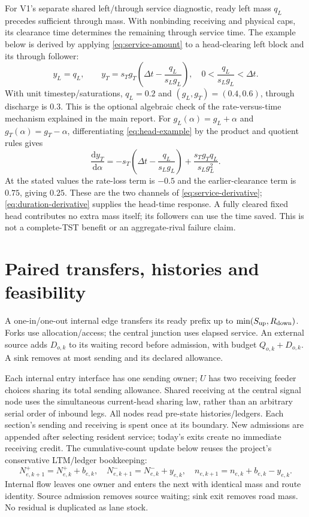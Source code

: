 \documentclass[10pt,a4paper]{article}
\newcommand{\rev}[1]{{\color{revisionred}#1}}
\begin{document}
For V1's separate shared left/through service diagnostic, ready left
mass $q_L$ precedes sufficient through mass. With nonbinding receiving
and physical caps, its clearance time determines the remaining through
service time.
\rev{The example below is derived by applying \eqref{eq:service-amount} to a head-clearing left block and its through follower:}
\begin{equation}
 y_L=q_L,\qquad
 y_T=s_Tg_T\left(\Delta t-\frac{q_L}{s_Lg_L}\right),
 \quad 0<\frac{q_L}{s_Lg_L}<\Delta t.
 \label{eq:head-example}
\end{equation}
With unit timestep/saturations, $q_L=0.2$ and $(g_L,g_T)=(0.4,0.6)$,
through discharge is $0.3$. This is the optional algebraic check of the
rate-versus-time mechanism explained in the main report. For
$g_L(\alpha)=g_L+\alpha$ and $g_T(\alpha)=g_T-\alpha$, differentiating
\eqref{eq:head-example} \rev{by the product and quotient rules gives}
\begin{equation}
 \frac{\mathrm dy_T}{\mathrm d\alpha}
 =-s_T\left(\Delta t-\frac{q_L}{s_Lg_L}\right)
    +\frac{s_Tg_Tq_L}{s_Lg_L^2}.
 \label{eq:head-example-derivative}
\end{equation}
At the stated values the rate-loss term is $-0.5$ and the earlier-clearance
term is $0.75$, giving $0.25$. These are the two channels of
\eqref{eq:service-derivative}; \eqref{eq:duration-derivative} supplies
the head-time response. A fully cleared fixed head contributes no extra
mass itself; its followers can use the time saved. This is not a
complete-TST benefit or an aggregate-rival failure claim.

\section{Paired transfers, histories and feasibility}

A one-in/one-out internal edge transfers its ready prefix up to
$\min(S_{\rm up},R_{\rm down})$. Forks use allocation/access; the central
junction uses elapsed service. An external source adds $D_{o,k}$ to its
waiting record before admission, with budget $Q_{o,k}+D_{o,k}$.
A sink removes at most sending and its declared allowance.

Each internal entry interface has one sending owner; $U$ has two
receiving feeder choices sharing its total sending allowance. Shared receiving at the
central signal node uses the simultaneous current-head sharing law, rather
than an arbitrary serial order of inbound legs.
All nodes read pre-state histories/ledgers. Each section's sending and
receiving is spent once at its boundary. New admissions are appended
after selecting resident service; today's exits create no immediate
receiving credit.
\rev{The cumulative-count update below reuses the project's conservative LTM/ledger bookkeeping:}
\begin{equation}
 N^+_{e,k+1}=N^+_{e,k}+b_{e,k},\quad
 N^-_{e,k+1}=N^-_{e,k}+y_{e,k},\quad
 n_{e,k+1}=n_{e,k}+b_{e,k}-y_{e,k}.
 \label{eq:state-update}
\end{equation}
Internal flow leaves one owner and enters the next with identical mass
and route identity. Source admission removes source waiting; sink exit
removes road mass. No residual is duplicated as lane stock.
\end{document}

